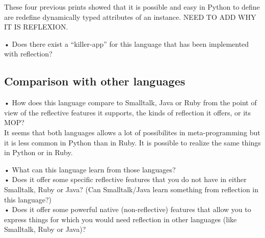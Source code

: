 These four previous prints showed that it is possible and easy in Python to define are redefine dynamically typed attributes of an instance. NEED TO ADD WHY IT IS REFLEXION.

•	Does there exist a “killer-app” for this language that has been implemented with reflection?\\

\subsection{Comparison with other languages}
•	How does this language compare to Smalltalk, Java or Ruby from the point of view of the reflective features it supports, the kinds of reflection it offers, or its MOP?\\
It seems that both languages allows a lot of possibilites in meta-programming but it is less common in Python than in Ruby. It is possible to realize the same things in Python or in Ruby.

•	What can this language learn from those languages?\\
•	Does it offer some specific reflective features that you do not have in either Smalltalk, Ruby or Java? (Can Smalltalk/Java learn something from reflection in this language?)\\
•	Does it offer some powerful native (non-reflective) features that allow you to express things for which you would need reflection in other languages (like Smalltalk, Ruby or Java)?\\
